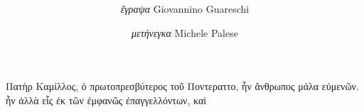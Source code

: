 \documentclass[a4paper, 12pt]{article}
\title{
	\Huge{\MyTitle}
}
\author{
	\textit{ἔγραψα} Giovannino Guareschi
	\and
	\textit{μετήνεγκα} Michele Palese
}
\date{}
\begin{document}
	\maketitle

	\begin{otherlanguage}{polytonicgreek}
		Πατὴρ Καμίλλος, ὁ πρωτοπρεσβύτερος τοῦ Ποντεραττο, ἦν ἄνθρωπος μάλα εὐμενῶν.
		ἦν ἀλλὰ εἷς ἐκ τῶν ἐμφανῶς ἐπαγγελλόντων, καὶ
	\end{otherlanguage}
\end{document}
